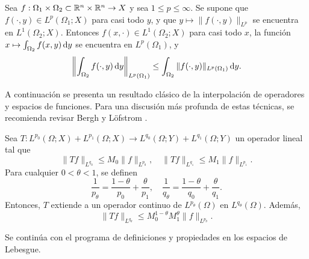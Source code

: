 \begin{proposition}\label{prop:monotonia-Lp}
    Sea $f:\Omega_1 \times \Omega_2 \subset\mathbb{R}^n\times\mathbb{R}^n\rightarrow X$ y 
    sea $1\leq p\leq\infty$.
    Se supone que $f(\cdot,y)\in L^p(\Omega_1;X)$ para casi
    todo $y$, y que $y\mapsto \|f(\cdot, y)\|_{L^p}$ se encuentra en
    $L^1(\Omega_2;X)$. Entonces $f(x, \cdot)\in L^1(\Omega_2;X)$ para casi
    todo $x$, la función $x\mapsto \int_{\Omega_2} f(x, y)\mathop{}\!\mathrm{d} y$ se encuentra
    en $L^p(\Omega_1)$, y
    \begin{equation*}
        \left\| \int_{\Omega_2} f(\cdot, y)\mathop{}\!\mathrm{d} y
        \right\|_{L^p(\Omega_1)} \leq \int_{\Omega_2} 
        \|f(\cdot, y)\|_{L^p(\Omega_1)} \mathop{}\!\mathrm{d} y.
    \end{equation*}
\end{proposition}
A continuación se presenta un resultado clásico de la interpolación de 
operadores y espacios de funciones. Para una discusión más profunda de estas técnicas, se recomienda revisar Bergh y L\"ofstrom \cite{bergh-lofstrom}.
\begin{theorem}\label{theo:riesz-thorin} 
    Sea $T:L^{p_0}(\Omega;X)+L^{p_1}(\Omega;X) \rightarrow 
    L^{q_0}(\Omega;Y)+L^{q_1}(\Omega;Y)$ un operador lineal tal que 
    \begin{equation*}
        \|Tf\|_{L^{q_0}} \leq M_0 \|f\|_{L^{p_0}}, \quad
        \|Tf\|_{L^{q_1}} \leq M_1 \|f\|_{L^{p_1}}.
    \end{equation*}
    Para cualquier $0<\theta<1$, se definen 
    \begin{equation*}
        \frac{1}{p_\theta} = \frac{1-\theta}{p_0} + \frac{\theta}{p_1}, 
        \quad 
        \frac{1}{q_\theta} = \frac{1-\theta}{q_0} + \frac{\theta}{q_1}.
    \end{equation*}
    Entonces, $T$ extiende a un operador continuo de $L^{p_\theta}(\Omega)$
    en $L^{q_\theta}(\Omega)$. Además, 
    \begin{equation*}
        \|Tf\|_{L^{q_\theta}} \leq M_0^{1-\theta}M_1^\theta \|f\|_{L^{p_\theta}}.
    \end{equation*}
\end{theorem}
Se continúa con el programa de definiciones y propiedades en los espacios 
de Lebesgue.

